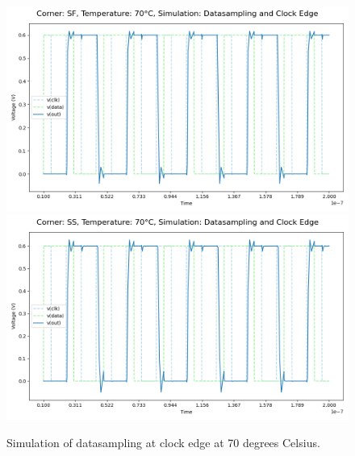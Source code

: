 \begin{figure}[H]
    \vspace{5pt}
    \includegraphics[height= 0.21\textheight]{figures/aimspice/SF70W1.png}
    \vspace{5pt}
    \includegraphics[height= 0.21\textheight]{figures/aimspice/SS70W1.png}
    \caption{Simulation of datasampling at clock edge at 70 degrees Celsius.}
    \label{fig:aimspice_W1_70}
\end{figure}

\pagebreak

